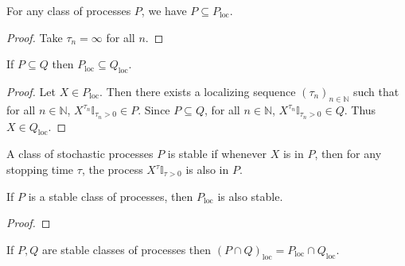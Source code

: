 \begin{lemma}\label{lem:implies_locally}
  \mathlibok
For any class of processes $P$, we have $P \subseteq P_{\mathrm{loc}}$.
\end{lemma}

\begin{proof}  
Take $\tau_n = \infty$ for all $n$.
\end{proof}


\begin{lemma}\label{lem:locally_mono}
  \mathlibok
If $P \subseteq Q$ then $P_{\mathrm{loc}} \subseteq Q_{\mathrm{loc}}$.
\end{lemma}

\begin{proof}Let $X \in P_{\mathrm{loc}}$.
Then there exists a localizing sequence $(\tau_n)_{n \in \mathbb{N}}$ such that for all $n \in \mathbb{N}$, $X^{\tau_n}\mathbb{I}_{\tau_n > 0} \in P$.
Since $P \subseteq Q$, for all $n \in \mathbb{N}$, $X^{\tau_n}\mathbb{I}_{\tau_n > 0} \in Q$.
Thus $X \in Q_{\mathrm{loc}}$.
\end{proof}


\begin{definition}\label{def:stable}
  \mathlibok
A class of stochastic processes $P$ is stable if whenever $X$ is in $P$, then for any stopping time $\tau$, the process $X^{\tau}\mathbb{I}_{\tau > 0}$ is also in $P$.
\end{definition}


\begin{lemma}\label{lem:isStable_locally}
  \mathlibok
If $P$ is a stable class of processes, then $P_{\mathrm{loc}}$ is also stable.
\end{lemma}

\begin{proof}
\end{proof}


\begin{lemma}\label{lem:locally_inter}
  \mathlibok
If $P, Q$ are stable classes of processes then $(P\cap Q)_{\mathrm{loc}} = P_{\mathrm{loc}}\cap Q_{\mathrm{loc}}$.
\end{lemma}

